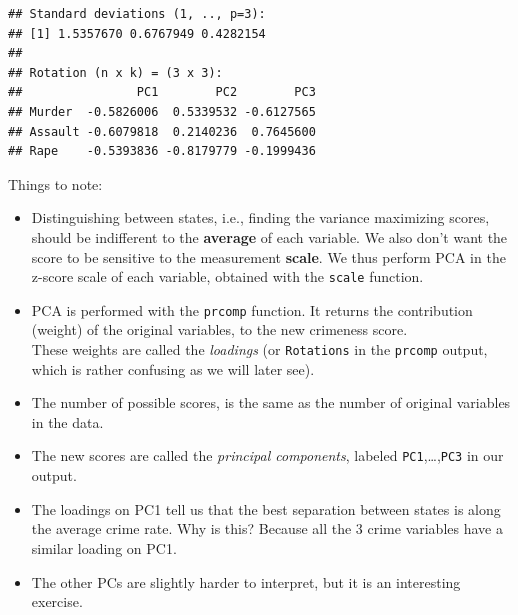 \documentclass[]{book}
\newenvironment{Shaded}{\begin{snugshade}}{\end{snugshade}}
\newcommand{\KeywordTok}[1]{\textcolor[rgb]{0.13,0.29,0.53}{\textbf{#1}}}
\newcommand{\DataTypeTok}[1]{\textcolor[rgb]{0.13,0.29,0.53}{#1}}
\newcommand{\DecValTok}[1]{\textcolor[rgb]{0.00,0.00,0.81}{#1}}
\newcommand{\StringTok}[1]{\textcolor[rgb]{0.31,0.60,0.02}{#1}}
\newcommand{\OtherTok}[1]{\textcolor[rgb]{0.56,0.35,0.01}{#1}}
\newcommand{\OperatorTok}[1]{\textcolor[rgb]{0.81,0.36,0.00}{\textbf{#1}}}
\newcommand{\NormalTok}[1]{#1}
\theoremstyle{definition}
\theoremstyle{definition}
\theoremstyle{definition}
\theoremstyle{remark}
\begin{document}
\begin{Shaded}
\end{Shaded}

\begin{verbatim}
## Standard deviations (1, .., p=3):
## [1] 1.5357670 0.6767949 0.4282154
## 
## Rotation (n x k) = (3 x 3):
##                PC1        PC2        PC3
## Murder  -0.5826006  0.5339532 -0.6127565
## Assault -0.6079818  0.2140236  0.7645600
## Rape    -0.5393836 -0.8179779 -0.1999436
\end{verbatim}

Things to note:

\begin{itemize}
\item
  Distinguishing between states, i.e., finding the variance maximizing
  scores, should be indifferent to the \textbf{average} of each
  variable. We also don't want the score to be sensitive to the
  measurement \textbf{scale}. We thus perform PCA in the z-score scale
  of each variable, obtained with the \texttt{scale} function.
\item
  PCA is performed with the \texttt{prcomp} function. It returns the
  contribution (weight) of the original variables, to the new crimeness
  score.\\
  These weights are called the \emph{loadings} (or \texttt{Rotations} in
  the \texttt{prcomp} output, which is rather confusing as we will later
  see).
\item
  The number of possible scores, is the same as the number of original
  variables in the data.
\item
  The new scores are called the \emph{principal components}, labeled
  \texttt{PC1},\ldots{},\texttt{PC3} in our output.
\item
  The loadings on PC1 tell us that the best separation between states is
  along the average crime rate. Why is this? Because all the \(3\) crime
  variables have a similar loading on PC1.
\item
  The other PCs are slightly harder to interpret, but it is an
  interesting exercise.
\end{itemize}
\end{document}
